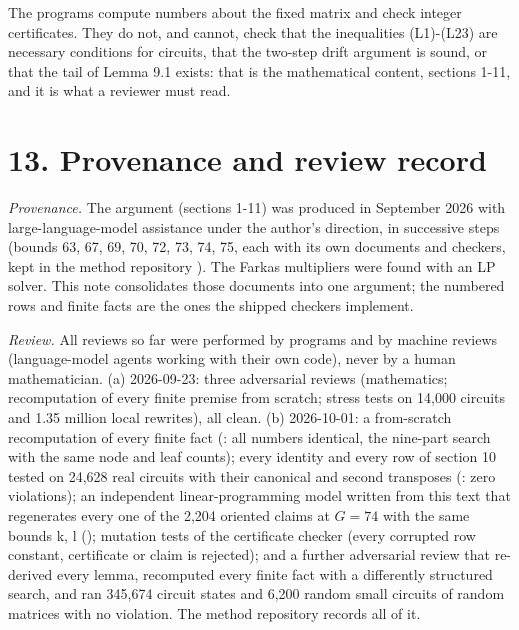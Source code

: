 The programs compute numbers about the fixed matrix and check integer certificates. They do not, and cannot, check that the inequalities (L1)-(L23) are necessary conditions for circuits, that the two-step drift argument is sound, or that the tail of Lemma 9.1 exists: that is the mathematical content, sections 1-11, and it is what a reviewer must read.

\hypertarget{provenance-and-review-record}{%
\section{13. Provenance and review record}\label{provenance-and-review-record}}

\emph{Provenance.} The argument (sections 1-11) was produced in September 2026 with large-language-model assistance under the author's direction, in successive steps (bounds 63, 67, 69, 70, 72, 73, 74, 75, each with its own documents and checkers, kept in the method repository \texttt{}). The Farkas multipliers were found with an LP solver. This note consolidates those documents into one argument; the numbered rows and finite facts are the ones the shipped checkers implement.

\emph{Review.} All reviews so far were performed by programs and by machine reviews (language-model agents working with their own code), never by a human mathematician. (a) 2026-09-23: three adversarial reviews (mathematics; recomputation of every finite premise from scratch; stress tests on 14,000 circuits and 1.35 million local rewrites), all clean. (b) 2026-10-01: a from-scratch recomputation of every finite fact (\texttt{}: all numbers identical, the nine-part search with the same node and leaf counts); every identity and every row of section 10 tested on 24,628 real circuits with their canonical and second transposes (\texttt{}: zero violations); an independent linear-programming model written from this text that regenerates every one of the 2,204 oriented claims at \(G=74\) with the same bounds k, l (\texttt{}); mutation tests of the certificate checker (every corrupted row constant, certificate or claim is rejected); and a further adversarial review that re-derived every lemma, recomputed every finite fact with a differently structured search, and ran 345,674 circuit states and 6,200 random small circuits of random matrices with no violation. The method repository records all of it.

